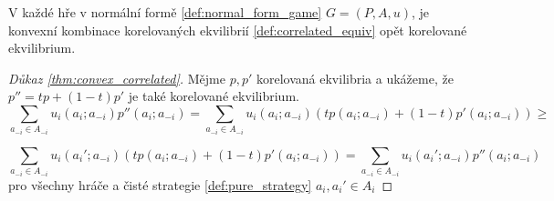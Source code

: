 \begin{theorem}
\label{thm:convex_correlated}
V každé hře v normální formě \ref{def:normal_form_game} $G= (P,A,u)$, je konvexní kombinace korelovaných ekvilibrií \ref{def:correlated_equiv} opět korelované ekvilibrium. 
\end{theorem}

\begin{proof}[Důkaz \ref{thm:convex_correlated}]
   Mějme $p,p'$ korelovaná ekvilibria a ukážeme, že $p'' = tp + (1-t) p'$ je také korelované ekvilibrium. 
   $$ 
   \sum_{a_{-i} \in A_{-i}} u_i(a_i; a_{-i})p''(a_i; a_{-i}) = \sum_{a_{-i} \in A_{-i}} u_i(a_i; a_{-i})( tp(a_i; a_{-i}) + (1-t)p'(a_i; a_{-i})) \geq 
   $$

   $$ 
   \sum_{a_{-i} \in A_{-i}} u_i(a_i'; a_{-i})( tp(a_i; a_{-i}) + (1-t)p'(a_i; a_{-i})) = \sum_{a_{-i} \in A_{-i}} u_i(a_i'; a_{-i})p''(a_i; a_{-i}) 
   $$
   pro všechny hráče a čisté strategie \ref{def:pure_strategy} $a_i, a_i' \in A_i$
\end{proof}
